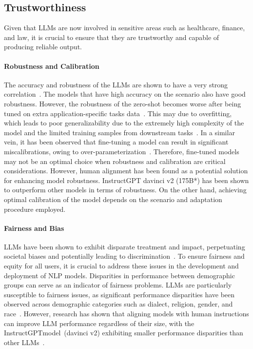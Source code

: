 \documentclass[manuscript,screen, nonacm]{acmart}
\begin{document}
\subsection{Trustworthiness}
Given that LLMs are now involved in sensitive areas such as healthcare, finance, and law, it is crucial to ensure that they are trustworthy and capable of producing reliable output. 


\paragraph{Robustness and Calibration}
The accuracy and robustness of the LLMs are shown to have a very strong correlation~\cite{liang2022holistic}. The models that have high accuracy on the scenario also have good robustness. However, the robustness of the zero-shot becomes worse after being tuned on extra application-specific tasks data~\cite{wortsman2022robust}. This may due to overfitting, which leads to poor generalizability due to the extremely high complexity of the model and the limited training samples from downstream tasks~\cite{hua2022fine}.
In a similar vein, it has been observed that fine-tuning a model can result in significant miscalibrations, owing to over-parameterization~\cite{kong2020calibrated}. Therefore, fine-tuned models may not be an optimal choice when robustness and calibration are critical considerations.
However, human alignment has been found as a potential solution for enhancing model robustness. InstructGPT davinci v2 (175B*) has been shown to outperform other models in terms of robustness. On the other hand, achieving optimal calibration of the model depends on the scenario and adaptation procedure employed.



\paragraph{Fairness and Bias}
LLMs have been shown to exhibit disparate treatment and impact, perpetuating societal biases and potentially leading to discrimination~\cite{buolamwini2018gender, beukeboom2019stereotypes}. To ensure fairness and equity for all users, it is crucial to address these issues in the development and deployment of NLP models. Disparities in performance between demographic groups can serve as an indicator of fairness problems.
LLMs are particularly susceptible to fairness issues, as significant performance disparities have been observed across demographic categories such as dialect, religion, gender, and race~\cite{liang2022holistic}. However, research has shown that aligning models with human instructions can improve LLM performance regardless of their size, with the InstructGPTmodel~(davinci v2)  exhibiting smaller performance disparities than other LLMs~\cite{chung2022scaling}. 
\end{document}
